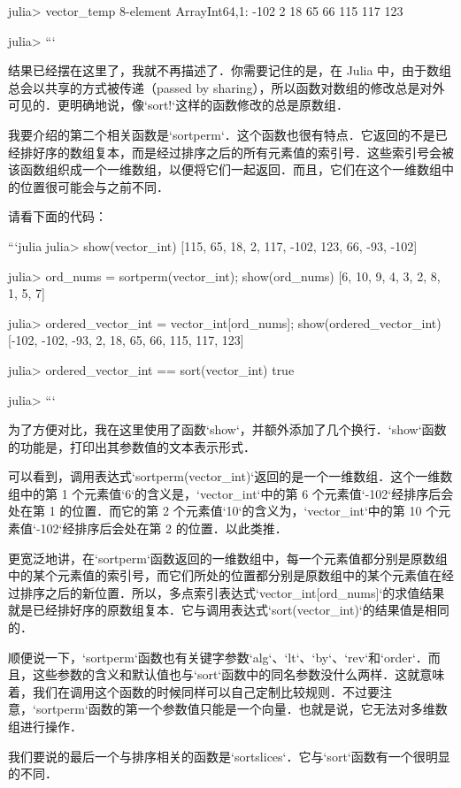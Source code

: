 julia> vector_temp
8-element Array{Int64,1}:
 -102
    2
   18
   65
   66
  115
  117
  123

julia> 
```

结果已经摆在这里了，我就不再描述了．你需要记住的是，在 Julia 中，由于数组总会以共享的方式被传递（passed by sharing），所以函数对数组的修改总是对外可见的．更明确地说，像`sort!`这样的函数修改的总是原数组．

我要介绍的第二个相关函数是`sortperm`．这个函数也很有特点．它返回的不是已经排好序的数组复本，而是经过排序之后的所有元素值的索引号．这些索引号会被该函数组织成一个一维数组，以便将它们一起返回．而且，它们在这个一维数组中的位置很可能会与之前不同．

请看下面的代码：

```julia
julia> show(vector_int)
[115, 65, 18, 2, 117, -102, 123, 66, -93, -102]

julia> ord_nums = sortperm(vector_int); show(ord_nums)
[6, 10, 9, 4, 3, 2, 8, 1, 5, 7]

julia> ordered_vector_int = vector_int[ord_nums]; show(ordered_vector_int)
[-102, -102, -93, 2, 18, 65, 66, 115, 117, 123]

julia> ordered_vector_int == sort(vector_int)
true

julia>
```

为了方便对比，我在这里使用了函数`show`，并额外添加了几个换行．`show`函数的功能是，打印出其参数值的文本表示形式．

可以看到，调用表达式`sortperm(vector_int)`返回的是一个一维数组．这个一维数组中的第 1 个元素值`6`的含义是，`vector_int`中的第 6 个元素值`-102`经排序后会处在第 1 的位置．而它的第 2 个元素值`10`的含义为，`vector_int`中的第 10 个元素值`-102`经排序后会处在第 2 的位置．以此类推．

更宽泛地讲，在`sortperm`函数返回的一维数组中，每一个元素值都分别是原数组中的某个元素值的索引号，而它们所处的位置都分别是原数组中的某个元素值在经过排序之后的新位置．所以，多点索引表达式`vector_int[ord_nums]`的求值结果就是已经排好序的原数组复本．它与调用表达式`sort(vector_int)`的结果值是相同的．

顺便说一下，`sortperm`函数也有关键字参数`alg`、`lt`、`by`、`rev`和`order`．而且，这些参数的含义和默认值也与`sort`函数中的同名参数没什么两样．这就意味着，我们在调用这个函数的时候同样可以自己定制比较规则．不过要注意，`sortperm`函数的第一个参数值只能是一个向量．也就是说，它无法对多维数组进行操作．

我们要说的最后一个与排序相关的函数是`sortslices`．它与`sort`函数有一个很明显的不同．

